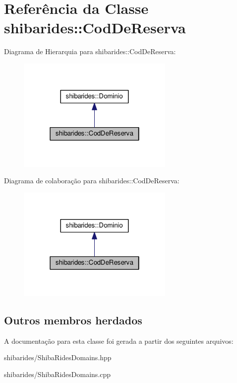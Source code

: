 \hypertarget{classshibarides_1_1CodDeReserva}{}\section{Referência da Classe shibarides\+:\+:Cod\+De\+Reserva}
\label{classshibarides_1_1CodDeReserva}


Diagrama de Hierarquia para shibarides\+:\+:Cod\+De\+Reserva\+:\nopagebreak
\begin{figure}[H]
\begin{center}
\leavevmode
\includegraphics[width=214pt]{classshibarides_1_1CodDeReserva__inherit__graph}
\end{center}
\end{figure}


Diagrama de colaboração para shibarides\+:\+:Cod\+De\+Reserva\+:\nopagebreak
\begin{figure}[H]
\begin{center}
\leavevmode
\includegraphics[width=214pt]{classshibarides_1_1CodDeReserva__coll__graph}
\end{center}
\end{figure}
\subsection*{Outros membros herdados}


A documentação para esta classe foi gerada a partir dos seguintes arquivos\+:\begin{DoxyCompactItemize}
\item 
shibarides/Shiba\+Rides\+Domains.\+hpp\item 
shibarides/Shiba\+Rides\+Domains.\+cpp\end{DoxyCompactItemize}
